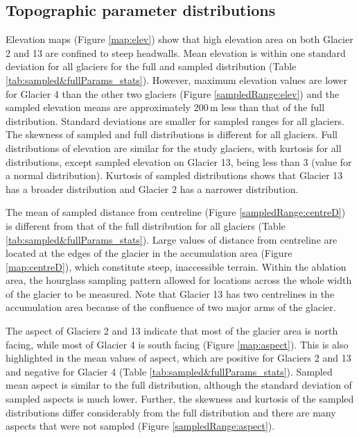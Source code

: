 \documentclass{sfuthesis}
\begin{document}
\subsection{Topographic parameter distributions}


Elevation maps (Figure \ref{map:elev}) show that high elevation area on both Glacier 2 and 13 are confined to steep headwalls. Mean elevation is within one standard deviation for all glaciers for the full and sampled distribution (Table \ref{tab:sampled&fullParams_stats}). However, maximum elevation values are lower for Glacier 4 than the other two glaciers (Figure \ref{sampledRange:elev}) and the sampled elevation means are approximately 200\,m less than that of the full distribution. Standard deviations are smaller for sampled ranges for all glaciers. The skewness of sampled and full distributions is different for all glaciers. Full distributions of elevation are similar for the study glaciers, with kurtosis for all distributions, except sampled elevation on Glacier 13, being less than 3 (value for a normal distribution). Kurtosis of sampled distributions shows that Glacier 13 has a broader distribution and Glacier 2 has a narrower distribution. 

The mean of sampled distance from centreline (Figure \ref{sampledRange:centreD}) is different from that of the full distribution for all glaciers (Table \ref{tab:sampled&fullParams_stats}). Large values of distance from centreline are located at the edges of the glacier in the accumulation area (Figure \ref{map:centreD}), which constitute steep, inaccessible terrain. Within the ablation area, the hourglass sampling pattern allowed for locations across the whole width of the glacier to be measured. Note that Glacier 13 has two centrelines in the accumulation area because of the confluence of two major arms of the glacier.

The aspect of Glaciers 2 and 13 indicate that most of the glacier area is north facing, while most of Glacier 4 is south facing (Figure \ref{map:aspect}). This is also highlighted in the mean values of aspect, which are positive for Glaciers 2 and 13 and negative for Glacier 4 (Table \ref{tab:sampled&fullParams_stats}). Sampled mean aspect is similar to the full distribution, although the standard deviation of sampled aspects is much lower. Further, the skewness and kurtosis of the sampled distributions differ considerably from the full distribution and there are many aspects that were not sampled (Figure \ref{sampledRange:aspect}). 
\end{document}
